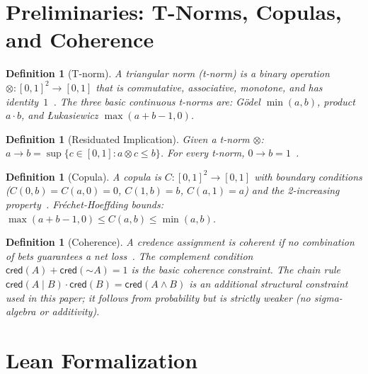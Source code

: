 \documentclass[11pt,a4paper]{article}
\newtheorem{definition}[theorem]{Definition}
\newcommand{\cred}{\mathsf{cred}}
\newcommand{\negc}{\mathord{\sim}}
\begin{document}
\appendix

\section{Preliminaries: T-Norms, Copulas, and Coherence}
\label{app:prelim}

\begin{definition}[T-norm]
\label{def:tnorm}
A \emph{triangular norm} (t-norm) is a binary operation
$\otimes : [0,1]^2 \to [0,1]$ that is commutative, associative,
monotone, and has identity~$1$~\cite{klement2000}.
The three basic continuous t-norms are:
G\"odel $\min(a, b)$,
product $a \cdot b$, and
\L ukasiewicz $\max(a + b - 1, 0)$.
\end{definition}

\begin{definition}[Residuated Implication]
\label{def:resid}
Given a t-norm $\otimes$:
$a \to b = \sup\{c \in [0,1] : a \otimes c \leq b\}$.
For every t-norm, $0 \to b = 1$~\cite{hajek1998}.
\end{definition}

\begin{definition}[Copula]
\label{def:copula}
A \emph{copula} is $C : [0,1]^2 \to [0,1]$ with boundary conditions
($C(0,b) = C(a,0) = 0$, $C(1,b) = b$, $C(a,1) = a$) and the
2-increasing property~\cite{nelsen2006}.
Fr\'echet-Hoeffding bounds:
$\max(a + b - 1, 0) \leq C(a, b) \leq \min(a, b)$.
\end{definition}

\begin{definition}[Coherence]
\label{def:dutchbook}
A credence assignment is \emph{coherent} if no combination of bets
guarantees a net loss~\cite{ramsey1931,definetti1937}.
The complement condition $\cred(A) + \cred(\negc A) = 1$ is the
basic coherence constraint.
The chain rule
$\cred(A \mid B) \cdot \cred(B) = \cred(A \land B)$ is an additional
structural constraint used in this paper; it follows from probability
but is strictly weaker (no sigma-algebra or additivity).
\end{definition}

\section{Lean Formalization}
\label{app:lean}
\end{document}

